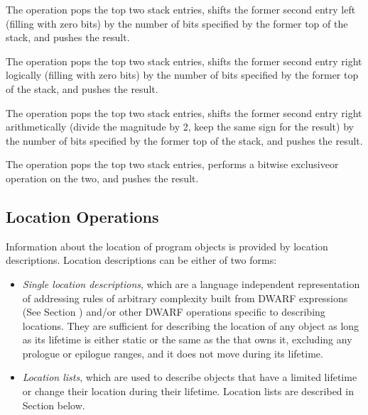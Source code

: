 \begin{enumerate}[1. ]
\itembfnl{\DWOPshlTARG}
The \DWOPshlNAME{} operation pops the top two stack entries,
shifts the former second entry left (filling with zero bits)
by the number of bits specified by the former top of the stack,
and pushes the result.

\itembfnl{\DWOPshrTARG}
The \DWOPshrNAME{} operation pops the top two stack entries,
shifts the former second entry right logically (filling with
zero bits) by the number of bits specified by the former top
of the stack, and pushes the result.

\itembfnl{\DWOPshraTARG}
The \DWOPshraNAME{} operation pops the top two stack entries,
shifts the former second entry right arithmetically (divide
the magnitude by 2, keep the same sign for the result) by
the number of bits specified by the former top of the stack,
and pushes the result.

\itembfnl{\DWOPxorTARG}
The \DWOPxorNAME{} operation pops the top two stack entries,
performs a bitwise exclusive\dash or operation on the two, and
pushes the result.

\end{enumerate}

\subsection{Location Operations}
\label{chap:locationoperations}
Information about the location of program objects is provided by
location descriptions. Location descriptions can be either of two
forms:

\begin{itemize}
\item \textit{Single location descriptions},
which
are
a language independent representation of
addressing rules of arbitrary complexity built from
DWARF expressions (See Section )
and/or other
DWARF operations specific to describing locations. They are
sufficient for describing the location of any object as long
as its lifetime is either static or the same as the
 that owns it,
\bb
excluding any prologue or epilogue ranges,
\eb
and it does not move during its lifetime.


\item \textit{Location lists}, which are used to
describe
objects that have a limited lifetime or change their location
during their lifetime. Location lists are described in
Section  below.

\end{itemize}

